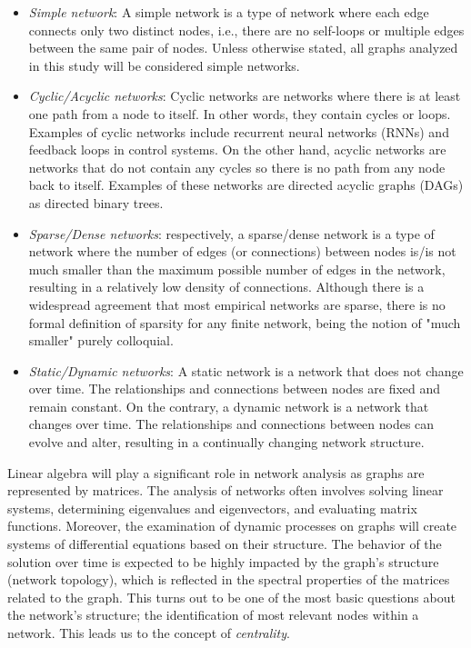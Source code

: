 \begin{itemize}
  \item \textit{Simple network}: A simple network is a type of network where each edge connects only two distinct nodes, i.e., there are no self-loops or multiple edges between the same pair of nodes. Unless otherwise stated, all graphs analyzed in this study will be considered simple networks.
  \item \textit{Cyclic/Acyclic networks}: Cyclic networks are networks where there is at least one path from a node to itself. In other words, they contain cycles or loops. Examples of cyclic networks include recurrent neural networks (RNNs) and feedback loops in control systems. On the other hand, acyclic networks are networks that do not contain any cycles so there is no path from any node back to itself. Examples of these networks are directed acyclic graphs (DAGs) as directed binary trees.
  \item \textit{Sparse/Dense networks}: respectively, a sparse/dense network is a type of network where the number of edges (or connections) between nodes is/is not much smaller than the maximum possible number of edges in the network, resulting in a relatively low density of connections. Although there is a widespread agreement that most empirical networks are sparse, there is no formal definition of sparsity for any finite network, being the notion of "much smaller" purely colloquial.
  \item \textit{Static/Dynamic networks}: A static network is a network that does not change over time. The relationships and connections between nodes are fixed and remain constant. On the contrary, a dynamic network is a network that changes over time. The relationships and connections between nodes can evolve and alter, resulting in a continually changing network structure.
\end{itemize}

Linear algebra will play a significant role in network analysis as graphs are represented by matrices. The analysis of networks often involves solving linear systems, determining eigenvalues and eigenvectors, and evaluating matrix functions. Moreover, the examination of dynamic processes on graphs will create systems of differential equations based on their structure. The behavior of the solution over time is expected to be highly impacted by the graph's structure (network topology), which is reflected in the spectral properties of the matrices related to the graph. This turns out to be one of the most basic questions about the network's structure; the identification of most relevant nodes within a network. This leads us to the concept of \textit{centrality}.

